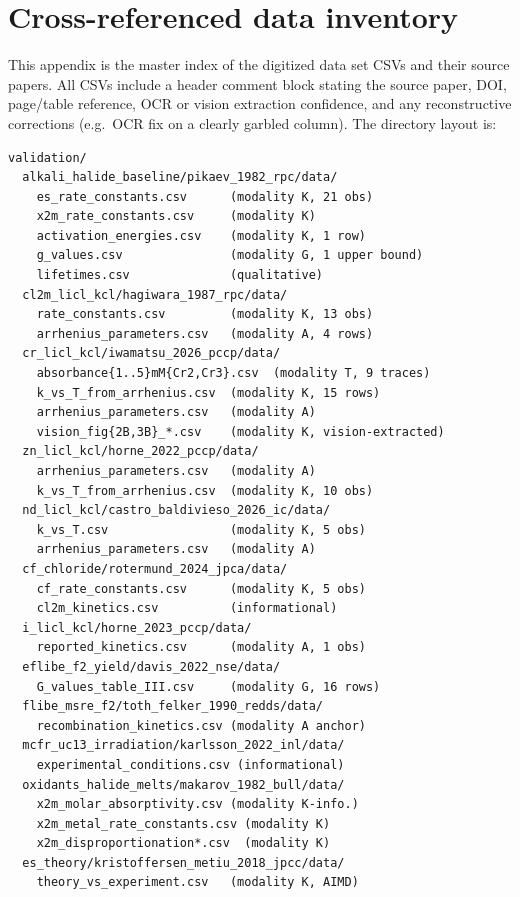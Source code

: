 \documentclass[11pt]{article}
\theoremstyle{plain}
\theoremstyle{definition}
\theoremstyle{remark}
\begin{document}
\section{Cross-referenced data inventory}\label{app:data}

This appendix is the master index of the digitized data set CSVs and their
source papers.  All CSVs include a header comment block stating the source
paper, DOI, page/table reference, OCR or vision extraction confidence, and
any reconstructive corrections (e.g.\ OCR fix on a clearly garbled column).
The directory layout is:

\begin{footnotesize}
\begin{verbatim}
validation/
  alkali_halide_baseline/pikaev_1982_rpc/data/
    es_rate_constants.csv      (modality K, 21 obs)
    x2m_rate_constants.csv     (modality K)
    activation_energies.csv    (modality K, 1 row)
    g_values.csv               (modality G, 1 upper bound)
    lifetimes.csv              (qualitative)
  cl2m_licl_kcl/hagiwara_1987_rpc/data/
    rate_constants.csv         (modality K, 13 obs)
    arrhenius_parameters.csv   (modality A, 4 rows)
  cr_licl_kcl/iwamatsu_2026_pccp/data/
    absorbance{1..5}mM{Cr2,Cr3}.csv  (modality T, 9 traces)
    k_vs_T_from_arrhenius.csv  (modality K, 15 rows)
    arrhenius_parameters.csv   (modality A)
    vision_fig{2B,3B}_*.csv    (modality K, vision-extracted)
  zn_licl_kcl/horne_2022_pccp/data/
    arrhenius_parameters.csv   (modality A)
    k_vs_T_from_arrhenius.csv  (modality K, 10 obs)
  nd_licl_kcl/castro_baldivieso_2026_ic/data/
    k_vs_T.csv                 (modality K, 5 obs)
    arrhenius_parameters.csv   (modality A)
  cf_chloride/rotermund_2024_jpca/data/
    cf_rate_constants.csv      (modality K, 5 obs)
    cl2m_kinetics.csv          (informational)
  i_licl_kcl/horne_2023_pccp/data/
    reported_kinetics.csv      (modality A, 1 obs)
  eflibe_f2_yield/davis_2022_nse/data/
    G_values_table_III.csv     (modality G, 16 rows)
  flibe_msre_f2/toth_felker_1990_redds/data/
    recombination_kinetics.csv (modality A anchor)
  mcfr_uc13_irradiation/karlsson_2022_inl/data/
    experimental_conditions.csv (informational)
  oxidants_halide_melts/makarov_1982_bull/data/
    x2m_molar_absorptivity.csv (modality K-info.)
    x2m_metal_rate_constants.csv (modality K)
    x2m_disproportionation*.csv  (modality K)
  es_theory/kristoffersen_metiu_2018_jpcc/data/
    theory_vs_experiment.csv   (modality K, AIMD)
\end{verbatim}
\end{footnotesize}
\end{document}
